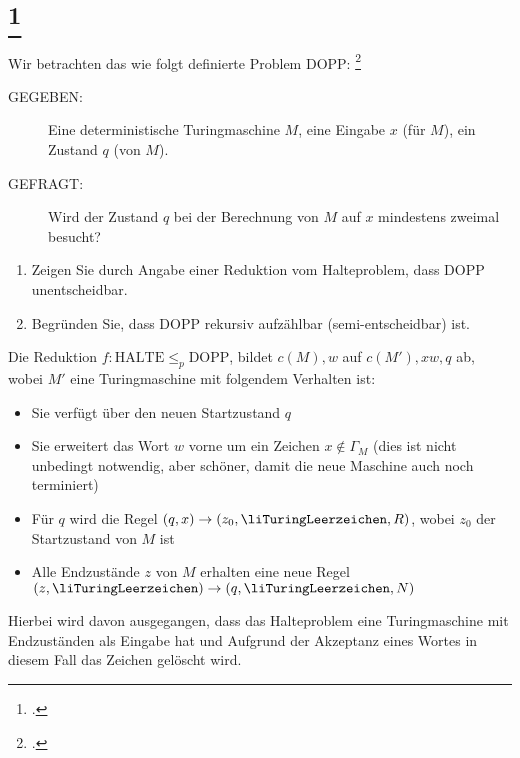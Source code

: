 \documentclass{bschlangaul-aufgabe}
\begin{document}
\section{
\footcite{examen:66115:2013:09}}

Wir betrachten das wie folgt definierte Problem DOPP:
\footcite[Aufgabe 8]{theo:ab:4}

\begin{description}
\item[GEGEBEN:]

Eine deterministische Turingmaschine $M$, eine Eingabe $x$ (für $M$),
ein Zustand $q$ (von $M$).

\item[GEFRAGT:]

Wird der Zustand $q$ bei der Berechnung von $M$ auf $x$ mindestens
zweimal besucht?
\end{description}

\begin{enumerate}


\item Zeigen Sie durch Angabe einer Reduktion vom Halteproblem, dass
DOPP unentscheidbar.

\item Begründen Sie, dass DOPP rekursiv aufzählbar (semi-entscheidbar)
ist.

\end{enumerate}

Die Reduktion $f \colon \text{HALTE} \leq_p \text{DOPP}$, bildet $c(M),
w$ auf $c(M'), xw, q$ ab, wobei $M'$ eine Turingmaschine mit folgendem
Verhalten ist:

\begin{itemize}
\item Sie verfügt über den neuen Startzustand $q$

\item Sie erweitert das Wort $w$ vorne um ein Zeichen $x \notin
\Gamma_M$ (dies ist nicht unbedingt notwendig, aber schöner, damit die
neue Maschine auch noch terminiert)

\item Für $q$ wird die Regel $(q, x) \rightarrow (z_0,
\liTuringLeerzeichen, R)$, wobei $z_0$ der Startzustand von $M$ ist

\item Alle Endzustände $z$ von $M$ erhalten eine neue Regel $(z,
\liTuringLeerzeichen) \rightarrow (q, \liTuringLeerzeichen, N)$
\end{itemize}

Hierbei wird davon ausgegangen, dass das Halteproblem eine
Turingmaschine mit Endzuständen als Eingabe hat und Aufgrund der
Akzeptanz eines Wortes in diesem Fall das Zeichen gelöscht wird.
\end{document}
